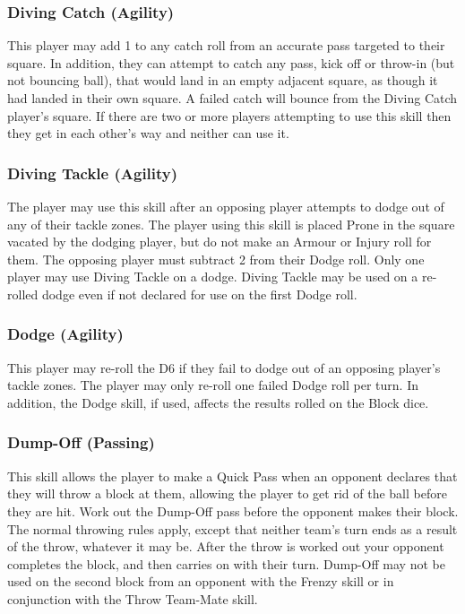 \documentclass{article}
\begin{document}
\begin{multicols}{3}
\subsubsection{Diving Catch (Agility)}
\par This player may add 1 to any catch roll from an accurate pass targeted to their square. In addition, they can attempt to catch any pass, kick off or throw-in (but not bouncing ball), that would land in an empty adjacent square, as though it had landed in their own square. A failed catch will bounce from the Diving Catch player's square. If there are two or more players attempting to use this skill then they get in each other's way and neither can use it.

\subsubsection{Diving Tackle (Agility)}
\par The player may use this skill after an opposing player attempts to dodge out of any of their tackle zones. The player using this skill is placed Prone in the square vacated by the dodging player, but do not make an Armour or Injury roll for them. The opposing player must subtract 2 from their Dodge roll. Only one player may use Diving Tackle on a dodge. Diving Tackle may be used on a re-rolled dodge even if not declared for use on the first Dodge roll.

\subsubsection{Dodge (Agility)}
\par This player may re-roll the D6 if they fail to dodge out of an opposing player's tackle zones. The player may only re-roll one failed Dodge roll per turn. In addition, the Dodge skill, if used, affects the results rolled on the Block dice.

\subsubsection{Dump-Off (Passing)}
\par This skill allows the player to make a Quick Pass when an opponent declares that they will throw a block at them, allowing the player to get rid of the ball before they are hit. Work out the Dump-Off pass before the opponent makes their block. The normal throwing rules apply, except that neither team's turn ends as a result of the throw, whatever it may be. After the throw is worked out your opponent completes the block, and then carries on with their turn. Dump-Off may not be used on the second block from an opponent with the Frenzy skill or in conjunction with the Throw Team-Mate skill.


\end{multicols}
\end{document}
